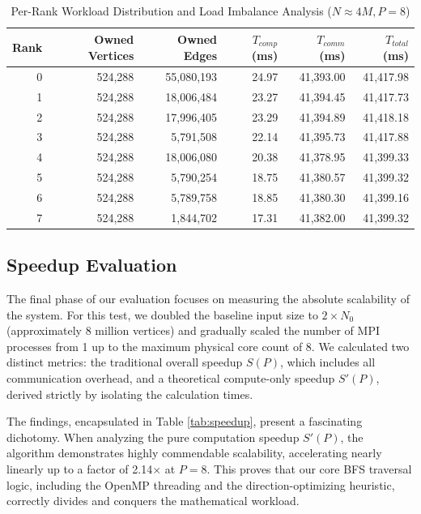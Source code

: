 \begin{table}[H]
\centering
\caption{Per-Rank Workload Distribution and Load Imbalance Analysis ($N \approx 4M, P=8$)}
\label{tab:granular}
\begin{tabular}{rrrrrr}
\toprule
\textbf{Rank} & \textbf{Owned Vertices} & \textbf{Owned Edges} & \textbf{$T_{comp}$ (ms)} & \textbf{$T_{comm}$ (ms)} & \textbf{$T_{total}$ (ms)} \\
\midrule
0 & 524,288 & 55,080,193 & 24.97 & 41,393.00 & 41,417.98 \\
1 & 524,288 & 18,006,484 & 23.27 & 41,394.45 & 41,417.73 \\
2 & 524,288 & 17,996,405 & 23.29 & 41,394.89 & 41,418.18 \\
3 & 524,288 &  5,791,508 & 22.14 & 41,395.73 & 41,417.88 \\
4 & 524,288 & 18,006,080 & 20.38 & 41,378.95 & 41,399.33 \\
5 & 524,288 &  5,790,254 & 18.75 & 41,380.57 & 41,399.32 \\
6 & 524,288 &  5,789,758 & 18.85 & 41,380.30 & 41,399.16 \\
7 & 524,288 &  1,844,702 & 17.31 & 41,382.00 & 41,399.32 \\
\bottomrule
\end{tabular}
\end{table}

\subsection{Speedup Evaluation}
The final phase of our evaluation focuses on measuring the absolute scalability of the system. For this test, we doubled the baseline input size to $2 \times N_0$ (approximately 8 million vertices) and gradually scaled the number of MPI processes from 1 up to the maximum physical core count of 8. We calculated two distinct metrics: the traditional overall speedup $S(P)$, which includes all communication overhead, and a theoretical compute-only speedup $S'(P)$, derived strictly by isolating the calculation times.

The findings, encapsulated in Table \ref{tab:speedup}, present a fascinating dichotomy. When analyzing the pure computation speedup $S'(P)$, the algorithm demonstrates highly commendable scalability, accelerating nearly linearly up to a factor of 2.14$\times$ at $P=8$. This proves that our core BFS traversal logic, including the OpenMP threading and the direction-optimizing heuristic, correctly divides and conquers the mathematical workload.

